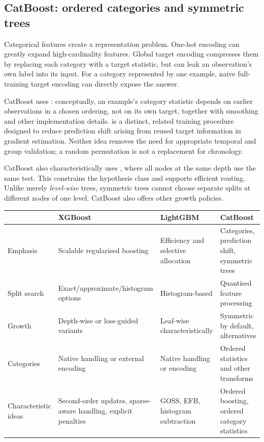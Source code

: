 \subsection{CatBoost: ordered categories and symmetric trees}
\label{subsec:trees-catboost-ordered-categories-and-symmetric-trees}
Categorical features create a representation problem.
One-hot encoding can greatly expand high-cardinality features.
Global target encoding compresses them by replacing each category with a target statistic, but can leak an observation's own label into its input.
For a category represented by one example, naive full-training target encoding can directly expose the answer.

CatBoost uses : conceptually, an example's category statistic depends on earlier observations in a chosen ordering, not on its own target, together with smoothing and other implementation details.
 is a distinct, related training procedure designed to reduce prediction shift arising from reused target information in gradient estimation.
Neither idea removes the need for appropriate temporal and group validation; a random permutation is not a replacement for chronology.

CatBoost also characteristically uses , where all nodes at the same depth use the same test.
This constrains the hypothesis class and supports efficient routing.
Unlike merely \emph{level-wise} trees, symmetric trees cannot choose separate splits at different nodes of one level.
CatBoost also offers other growth policies.

\begin{center}\footnotesize
\begin{tabularx}{\linewidth}{@{}L{.17\linewidth}YYY@{}}\toprule
 & XGBoost & LightGBM & CatBoost\\\midrule
Emphasis & Scalable regularised boosting & Efficiency and selective allocation & Categories, prediction shift, symmetric trees\\
Split search & Exact/approximate/histogram options & Histogram-based & Quantised feature processing\\
Growth & Depth-wise or loss-guided variants & Leaf-wise characteristically & Symmetric by default, alternatives\\
Categories & Native handling or external encoding & Native handling or encoding & Ordered statistics and other transforms\\
Characteristic ideas & Second-order updates, sparse-aware handling, explicit penalties & GOSS, EFB, histogram subtraction & Ordered boosting, ordered category statistics\\\bottomrule
\end{tabularx}
\end{center}


